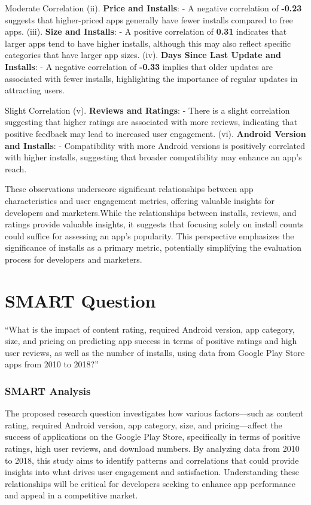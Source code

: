 \documentclass[
]{article}
\begin{document}
Moderate Correlation (ii). \textbf{Price and Installs}: - A negative
correlation of \textbf{-0.23} suggests that higher-priced apps generally
have fewer installs compared to free apps. (iii). \textbf{Size and
Installs}: - A positive correlation of \textbf{0.31} indicates that
larger apps tend to have higher installs, although this may also reflect
specific categories that have larger app sizes. (iv). \textbf{Days Since
Last Update and Installs}: - A negative correlation of \textbf{-0.33}
implies that older updates are associated with fewer installs,
highlighting the importance of regular updates in attracting users.

Slight Correlation (v). \textbf{Reviews and Ratings}: - There is a
slight correlation suggesting that higher ratings are associated with
more reviews, indicating that positive feedback may lead to increased
user engagement. (vi). \textbf{Android Version and Installs}: -
Compatibility with more Android versions is positively correlated with
higher installs, suggesting that broader compatibility may enhance an
app's reach.

These observations underscore significant relationships between app
characteristics and user engagement metrics, offering valuable insights
for developers and marketers.While the relationships between installs,
reviews, and ratings provide valuable insights, it suggests that
focusing solely on install counts could suffice for assessing an app's
popularity. This perspective emphasizes the significance of installs as
a primary metric, potentially simplifying the evaluation process for
developers and marketers.

\section{\texorpdfstring{\textbf{SMART
Question}}{SMART Question}}\label{smart-question}

``What is the impact of content rating, required Android version, app
category, size, and pricing on predicting app success in terms of
positive ratings and high user reviews, as well as the number of
installs, using data from Google Play Store apps from 2010 to 2018?''

\subsubsection{SMART Analysis}\label{smart-analysis}

The proposed research question investigates how various factors---such
as content rating, required Android version, app category, size, and
pricing---affect the success of applications on the Google Play Store,
specifically in terms of positive ratings, high user reviews, and
download numbers. By analyzing data from 2010 to 2018, this study aims
to identify patterns and correlations that could provide insights into
what drives user engagement and satisfaction. Understanding these
relationships will be critical for developers seeking to enhance app
performance and appeal in a competitive market.
\end{document}
